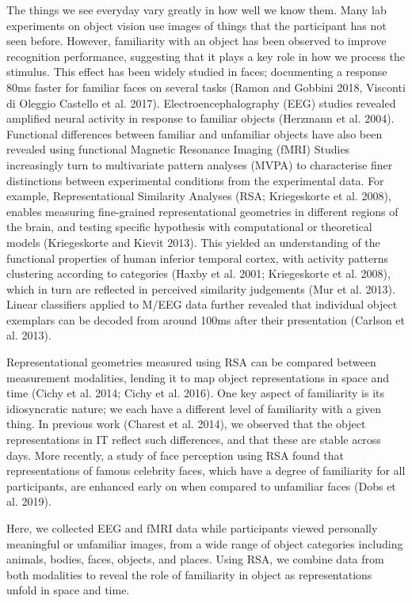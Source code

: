 \documentclass[10pt,letterpaper]{article}
\begin{document}
The things we see everyday vary greatly in how well we know them. 
Many lab experiments on object vision use images of things that 
the participant has not seen before. However, familiarity with 
an object has been observed to improve recognition performance, 
suggesting that it plays a key role in how we process the stimulus. 
This effect has been widely studied in faces; documenting a response 
80ms faster for familiar faces on several tasks (Ramon and Gobbini 2018, 
Visconti di Oleggio Castello et al. 2017). 
Electroencephalography (EEG) studies revealed  amplified neural 
activity in response to familiar objects (Herzmann et al. 2004). 
Functional differences between familiar and unfamiliar objects 
have also been revealed using functional Magnetic Resonance Imaging (fMRI)
\cite{Barense2011-bl,McLelland2014-es,Taylor2009-hw,Trinkler2009-dm} 
Studies increasingly turn to multivariate pattern analyses (MVPA) 
to characterise finer distinctions between experimental conditions 
from the experimental data. For example, Representational Similarity 
Analyses (RSA; Kriegeskorte et al. 2008), enables measuring fine-grained 
representational geometries in different regions of the brain, 
and testing specific hypothesis with computational or theoretical 
models (Kriegeskorte and Kievit 2013). This yielded an understanding 
of the functional properties of human inferior temporal cortex, 
with activity patterns clustering according to categories 
(Haxby et al. 2001; Kriegeskorte et al. 2008), which in turn are 
reflected in perceived similarity judgements (Mur et al. 2013).  
Linear classifiers applied to M/EEG data further revealed that 
individual object exemplars can be decoded from around 100ms 
after their presentation (Carlson et al. 2013). 

Representational geometries measured using RSA can be 
compared between measurement modalities, lending it to 
map object representations in space and time 
(Cichy et al. 2014; Cichy et al. 2016). One key aspect of 
familiarity is its idiosyncratic nature; we each have a 
different level of familiarity with a given thing. In previous work 
(Charest et al. 2014), we observed that the object representations 
in IT reflect such differences, and that these are stable across days. 
More recently, a study of face perception using RSA found that 
representations of famous celebrity faces, which have a degree of 
familiarity for all participants, are enhanced early on when 
compared to unfamiliar faces (Dobs et al. 2019). 

Here, we collected EEG and fMRI data while participants viewed 
personally meaningful or unfamiliar images, from a wide range 
of object categories including animals, bodies, faces, objects, 
and places. Using RSA, we combine data from both modalities to 
reveal the role of familiarity in object as representations 
unfold in space and time.
\end{document}

